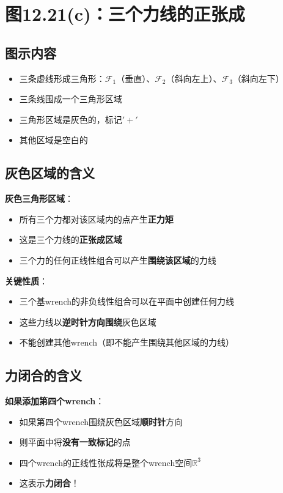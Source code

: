 \documentclass[12pt,a4paper]{article}
\begin{document}
\section{图12.21(c)：三个力线的正张成}

\subsection{图示内容}

\begin{itemize}
\item 三条虚线形成三角形：$\mathcal{F}_1$（垂直）、$\mathcal{F}_2$（斜向左上）、$\mathcal{F}_3$（斜向左下）
\item 三条线围成一个三角形区域
\item 三角形区域是灰色的，标记$'+'$
\item 其他区域是空白的
\end{itemize}

\subsection{灰色区域的含义}

\textbf{灰色三角形区域}：
\begin{itemize}
\item 所有三个力都对该区域内的点产生\textbf{正力矩}
\item 这是三个力线的\textbf{正张成区域}
\item 三个力的任何正线性组合可以产生\textbf{围绕该区域}的力线
\end{itemize}

\textbf{关键性质}：
\begin{itemize}
\item 三个基wrench的非负线性组合可以在平面中创建任何力线
\item 这些力线以\textbf{逆时针方向围绕}灰色区域
\item 不能创建其他wrench（即不能产生围绕其他区域的力线）
\end{itemize}

\subsection{力闭合的含义}

\textbf{如果添加第四个wrench}：
\begin{itemize}
\item 如果第四个wrench围绕灰色区域\textbf{顺时针}方向
\item 则平面中将\textbf{没有一致标记}的点
\item 四个wrench的正线性张成将是整个wrench空间$\mathbb{R}^3$
\item 这表示\textbf{力闭合}！
\end{itemize}
\end{document}
